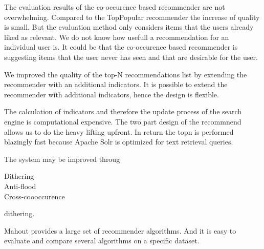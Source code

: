 The evaluation results of the co-occurence based recommender are not overwhelming. Compared to the TopPopular recommender the increase of quality is small. But the evaluation method only considers items that the users already liked as relevant. We do not know how usefull a recommendation for an individual user is. It could be that the co-occurence based recommender is suggesting items that the user never has seen and that are desirable for the user.

We improved the quality of the top-N recommendations list by extending the recommender with an additional indicators. It is possible to extend the recommender with additional indicators, hence the design is flexible.

The calculation of indicators and therefore the update process of the search engine is computational expensive. The two part design of the recommnend allows us to do the heavy lifting upfront. In return the \gls{topn} is performed blazingly fast because Apache Solr is optimized for text retrieval queries. 

The system may be improved throug 
\begin{description}
\item[Dithering] 
\item[Anti-flood] 
\item[Cross-coooccurence]
\end{description}
dithering.

Mahout provides a large set of recommender algorithms. And it is easy to evaluate and compare several algorithms on a specific dataset.
